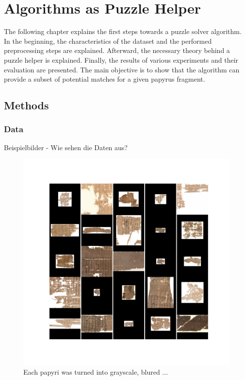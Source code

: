 \chapter{Algorithms as Puzzle Helper}
\label{chap:puzzleHelper}

The following chapter explains the first steps towards a puzzle solver algorithm. In the beginning, the characteristics of the dataset and the performed preprocessing steps are explained. Afterward, the necessary theory behind a puzzle helper is explained. Finally, the results of various experiments and their evaluation are presented. The main objective is to show that the algorithm can provide a subset of potential matches for a given papyrus fragment.  

\section{Methods}

\subsection{Data}


Beispielbilder  - Wie sehen die Daten aus? 

\begin{figure}[t]
	\label{fig:sample_grid}
	\includegraphics[width=\textwidth]{figures/sample_grid.pdf}
	\caption{Each papyri was turned into grayscale, blured ...}
\end{figure}


